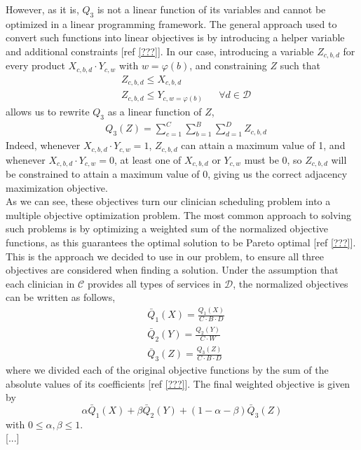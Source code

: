 However, as it is, $Q_3$ is not a linear function of its variables and cannot be optimized in a linear programming framework. The general approach used to convert such functions into linear objectives is by introducing a helper variable and additional constraints [ref \ref{???}]. In our case, introducing a variable $Z_{c, b, d}$ for every product $X_{c, b, d} \cdot Y_{c, w}$ with $w = \varphi(b)$, and constraining $Z$ such that 
\begin{align}
	&Z_{c, b, d} \leq X_{c, b, d} \\
	&Z_{c, b, d} \leq Y_{c, w=\varphi(b)} &&\forall d\in\mathcal{D}
\end{align}
allows us to rewrite $Q_3$ as a linear function of $Z$,
\begin{align}
	&Q_3(Z) = \sum_{c=1}^{C} \sum_{b=1}^{B} \sum_{d=1}^{D} Z_{c, b, d}
\end{align}
Indeed, whenever $X_{c, b, d} \cdot Y_{c, w} = 1$, $Z_{c, b, d}$ can attain a maximum value of 1, and whenever $X_{c, b, d} \cdot Y_{c, w} = 0$, at least one of $X_{c, b, d}$ or $Y_{c, w}$ must be 0, so $Z_{c, b, d}$ will be constrained to attain a maximum value of 0, giving us the correct adjacency maximization objective. \\

As we can see, these objectives turn our clinician scheduling problem into a multiple objective optimization problem. The most common approach to solving such problems is by optimizing a weighted sum of the normalized objective functions, as this guarantees the optimal solution to be Pareto optimal [ref \ref{???}]. This is the approach we decided to use in our problem, to ensure all three objectives are considered when finding a solution. Under the assumption that each clinician in $\mathcal{C}$ provides all types of services in $\mathcal{D}$, the normalized objectives can be written as follows,
\begin{align}
	&\bar{Q}_1(X) = \frac{Q_1(X)}{C \cdot B \cdot D} \tag{Block Requests} \label{eqn:norm-obj-block-requests}\\
	&\bar{Q}_2(Y) = \frac{Q_2(Y)}{C \cdot W} \tag{Weekend Requests} \label{eqn:norm-obj-weekend-requests} \\
	&\bar{Q}_3(Z) = \frac{Q_3(Z)}{C \cdot B \cdot D} \tag{Block-Weekend Adjacency} \label{eqn:norm-obj-block-weekend-adj}
\end{align}
where we divided each of the original objective functions by the sum of the absolute values of its coefficients [ref \ref{???}]. The final weighted objective is given by
\begin{equation}
	\alpha \bar{Q}_1(X) + \beta \bar{Q}_2(Y) + (1 - \alpha - \beta) \bar{Q}_3(Z)
\end{equation}
with $0 \leq \alpha, \beta \leq 1$. \\

[...]